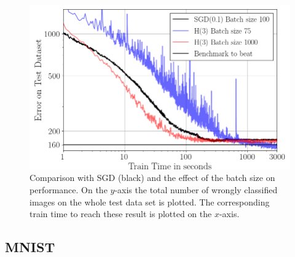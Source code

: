 \documentclass[conference]{IEEEtran}
\begin{document}
	\begin{figure}[htbp]
		\centerline{\includegraphics[scale=0.52]{Plot_Batch_size.png}}
		\caption{Comparison with SGD (black) and the effect of the batch size on performance. On the $y$-axis the total number of wrongly classified images on the whole test data set is plotted. The corresponding train time to reach these result is plotted on the $x$-axis.}
		\label{fig3}
	\end{figure}

	\subsection{MNIST}
\end{document}

